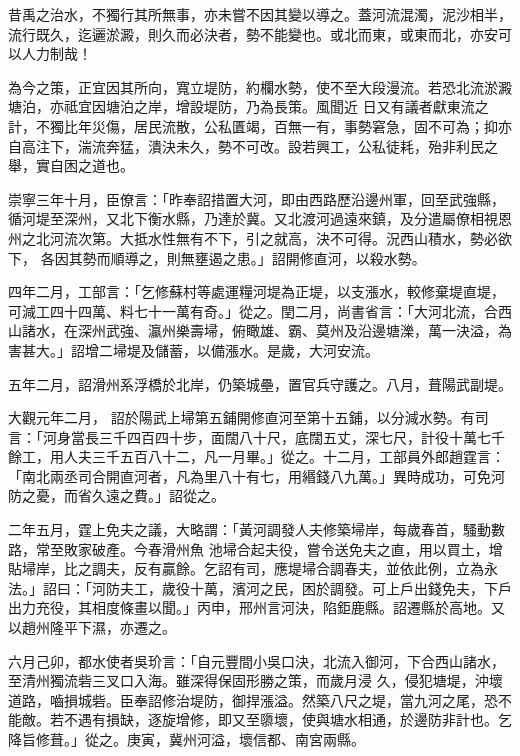 \begin{pinyinscope}
 昔禹之治水，不獨行其所無事，亦未嘗不因其變以導之。蓋河流混濁，泥沙相半，流行既久，迄邐淤澱，則久而必決者，勢不能變也。或北而東，或東而北，亦安可以人力制哉！



 為今之策，正宜因其所向，寬立堤防，約欄水勢，使不至大段漫流。若恐北流淤澱塘泊，亦祗宜因塘泊之岸，增設堤防，乃為長策。風聞近
 日又有議者獻東流之計，不獨比年災傷，居民流散，公私匱竭，百無一有，事勢窘急，固不可為；抑亦自高注下，湍流奔猛，潰決未久，勢不可改。設若興工，公私徒耗，殆非利民之舉，實自困之道也。



 崇寧三年十月，臣僚言：「昨奉詔措置大河，即由西路歷沿邊州軍，回至武強縣，循河堤至深州，又北下衡水縣，乃達於冀。又北渡河過遠來鎮，及分遣屬僚相視恩州之北河流次第。大抵水性無有不下，引之就高，決不可得。況西山積水，勢必欲下，
 各因其勢而順導之，則無壅遏之患。」詔開修直河，以殺水勢。



 四年二月，工部言：「乞修蘇村等處運糧河堤為正堤，以支漲水，較修棄堤直堤，可減工四十四萬、料七十一萬有奇。」從之。閏二月，尚書省言：「大河北流，合西山諸水，在深州武強、瀛州樂壽埽，俯瞰雄、霸、莫州及沿邊塘濼，萬一決溢，為害甚大。」詔增二埽堤及儲蓄，以備漲水。是歲，大河安流。



 五年二月，詔滑州系浮橋於北岸，仍築城壘，置官兵守護之。八月，葺陽武副堤。



 大觀元年二月，
 詔於陽武上埽第五鋪開修直河至第十五鋪，以分減水勢。有司言：「河身當長三千四百四十步，面闊八十尺，底闊五丈，深七尺，計役十萬七千餘工，用人夫三千五百八十二，凡一月畢。」從之。十二月，工部員外郎趙霆言：「南北兩丞司合開直河者，凡為里八十有七，用緡錢八九萬。」異時成功，可免河防之憂，而省久遠之費。」詔從之。



 二年五月，霆上免夫之議，大略謂：「黃河調發人夫修築埽岸，每歲春首，騷動數路，常至敗家破產。今春滑州魚
 池埽合起夫役，嘗令送免夫之直，用以買土，增貼埽岸，比之調夫，反有贏餘。乞詔有司，應堤埽合調春夫，並依此例，立為永法。」詔曰：「河防夫工，歲役十萬，濱河之民，困於調發。可上戶出錢免夫，下戶出力充役，其相度條畫以聞。」丙申，邢州言河決，陷鉅鹿縣。詔遷縣於高地。又以趙州隆平下濕，亦遷之。



 六月己卯，都水使者吳玠言：「自元豐間小吳口決，北流入御河，下合西山諸水，至清州獨流砦三叉口入海。雖深得保固形勝之策，而歲月浸
 久，侵犯塘堤，沖壞道路，嚙損城砦。臣奉詔修治堤防，御捍漲溢。然築八尺之堤，當九河之尾，恐不能敵。若不遇有損缺，逐旋增修，即又至隳壞，使與塘水相通，於邊防非計也。乞降旨修葺。」從之。庚寅，冀州河溢，壞信都、南宮兩縣。




\end{pinyinscope}
